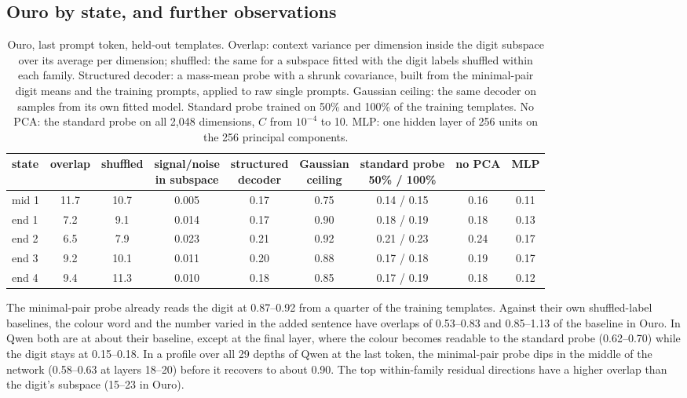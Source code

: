 \documentclass{article}
\begin{document}
\subsection{Ouro by state, and further observations}\label{app:state}

\begin{table}[h]
\centering
\caption{Ouro, last prompt token, held-out templates. Overlap: context variance per dimension inside the digit subspace over its average per dimension; shuffled: the same for a subspace fitted with the digit labels shuffled within each family. Structured decoder: a mass-mean probe with a shrunk covariance, built from the minimal-pair digit means and the training prompts, applied to raw single prompts. Gaussian ceiling: the same decoder on samples from its own fitted model. Standard probe trained on 50\% and 100\% of the training templates. No PCA: the standard probe on all 2,048 dimensions, $C$ from $10^{-4}$ to 10. MLP: one hidden layer of 256 units on the 256 principal components.}
\label{tab:swamp}
\small
\begin{tabular}{@{}lcccccccc@{}}
\toprule
state & overlap & shuffled & \shortstack{signal/noise\\in subspace} & \shortstack{structured\\decoder} & \shortstack{Gaussian\\ceiling} & \shortstack{standard probe\\50\% / 100\%} & no PCA & MLP \\
\midrule
mid 1 & 11.7 & 10.7 & 0.005 & 0.17 & 0.75 & 0.14 / 0.15 & 0.16 & 0.11 \\
end 1 & 7.2 & 9.1 & 0.014 & 0.17 & 0.90 & 0.18 / 0.19 & 0.18 & 0.13 \\
end 2 & 6.5 & 7.9 & 0.023 & 0.21 & 0.92 & 0.21 / 0.23 & 0.24 & 0.17 \\
end 3 & 9.2 & 10.1 & 0.011 & 0.20 & 0.88 & 0.17 / 0.18 & 0.19 & 0.17 \\
end 4 & 9.4 & 11.3 & 0.010 & 0.18 & 0.85 & 0.17 / 0.19 & 0.18 & 0.12 \\
\bottomrule
\end{tabular}
\end{table}

The minimal-pair probe already reads the digit at 0.87--0.92 from a quarter of the training templates. Against their own shuffled-label baselines, the colour word and the number varied in the added sentence have overlaps of 0.53--0.83 and 0.85--1.13 of the baseline in Ouro. In Qwen both are at about their baseline, except at the final layer, where the colour becomes readable to the standard probe (0.62--0.70) while the digit stays at 0.15--0.18. In a profile over all 29 depths of Qwen at the last token, the minimal-pair probe dips in the middle of the network (0.58--0.63 at layers 18--20) before it recovers to about 0.90. The top within-family residual directions have a higher overlap than the digit's subspace (15--23 in Ouro).
\end{document}
